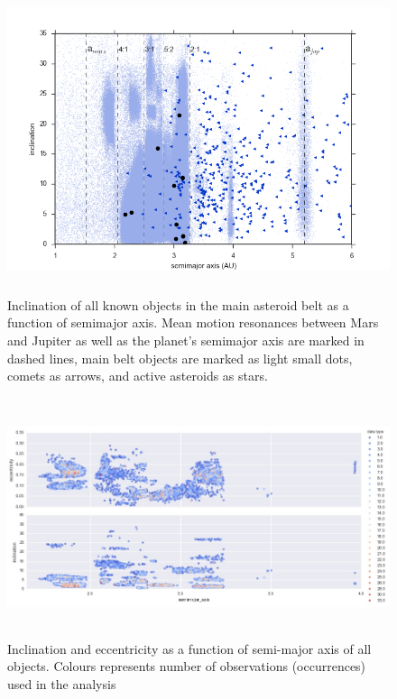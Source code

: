 \documentclass[iop,apj]{emulateapj}
\begin{document}




\begin{figure}[!htb]
    \centering
    \includegraphics[height=9cm]{graphs/aa_comets_mba_all.png}
    \caption{Inclination of all known objects in the main asteroid belt as a function of semimajor axis.  Mean motion resonances between Mars and Jupiter as well as the planet's semimajor axis are marked in dashed lines, main belt objects are marked as light small dots, comets as arrows, and active asteroids as stars. \cite{mpc}}\label{fig:1}
\end{figure}

\begin{figure}[!htb]
    \centering
    \includegraphics[height=7cm]{graphs/a_e_i_occur.png}
    \caption{Inclination and eccentricity as a function of semi-major axis of all objects. Colours represents number of observations (occurrences) used in the analysis}\label{fig:2}
\end{figure}
\end{document}
